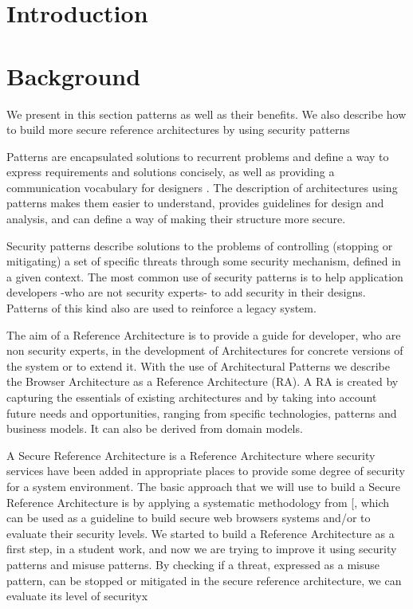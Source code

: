 \documentclass{sig-alternate-05-2015}
\begin{document}





\section*{Introduction}

\section*{Background}
We present in this section patterns as well as their benefits. We also describe how to build more secure reference architectures by using security patterns

Patterns are encapsulated solutions to recurrent problems and define a way to express requirements and solutions concisely, as well as providing a communication vocabulary for designers \cite{gamma1994design}. The description of architectures using patterns makes them easier to understand, provides guidelines for design and analysis, and can define a way of making their structure more secure.

Security patterns describe solutions to the problems of controlling (stopping or mitigating) a set of specific threats through some security mechanism, defined in a given context. The most common use of security patterns is to help application developers -who are not security experts- to add security in their designs. Patterns of this kind also are used to reinforce a legacy system.

The aim of a Reference Architecture is to provide a guide for developer, who are non security experts, in the development of Architectures for concrete versions of the system or to extend it. With the use of Architectural Patterns we describe the Browser Architecture as a Reference Architecture (RA). A RA is created by capturing the essentials of existing architectures and by taking into account future needs and opportunities, ranging from specific technologies, patterns and business models. It can also be derived from domain models.

A Secure Reference Architecture is a Reference Architecture where security services have been added in appropriate places to provide some degree of security for a system environment. The basic approach that we will use to build a Secure Reference Architecture is by applying a systematic methodology from [\cite{fernandez2006methodology,Fernandez2011}, which can be used as a guideline to build secure web browsers systems and/or to evaluate their security levels. We started to build a Reference Architecture as a first step, in a student work, and now we are trying to improve it using security patterns and misuse patterns. By checking if a threat, expressed as a misuse pattern, can be stopped or mitigated in the secure reference architecture, we can evaluate its level of securityx
\end{document}
